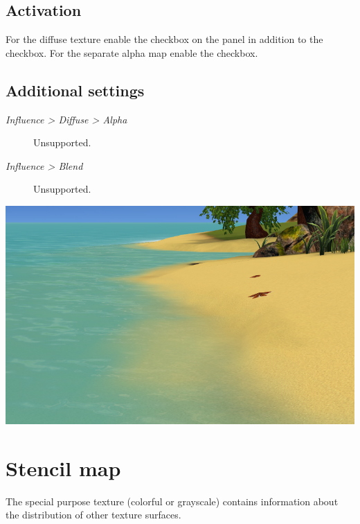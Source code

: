 \documentclass[a4paper,12pt,oneside]{sphinxmanual}
\begin{document}
\subsection{Activation}
\label{textures:id12}
For the diffuse texture enable the  checkbox on the  panel in addition to the  checkbox. For the separate alpha map enable the  checkbox.


\subsection{Additional settings}
\label{textures:id13}\begin{description}
\item[{\emph{Influence \textgreater{} Diffuse \textgreater{} Alpha}}] \leavevmode
Unsupported.

\item[{\emph{Influence \textgreater{} Blend}}] \leavevmode
Unsupported.

\end{description}

{\hfill\includegraphics[width=1.000\linewidth]{alpha_map_water.jpg}\hfill}

\begin{DUlineblock}{0em}
\item[] 
\end{DUlineblock}


\section{Stencil map}
\label{textures:stencil-map}\label{textures:index-9}
The special purpose texture (colorful or grayscale) contains information about the distribution of other texture surfaces.
\end{document}
